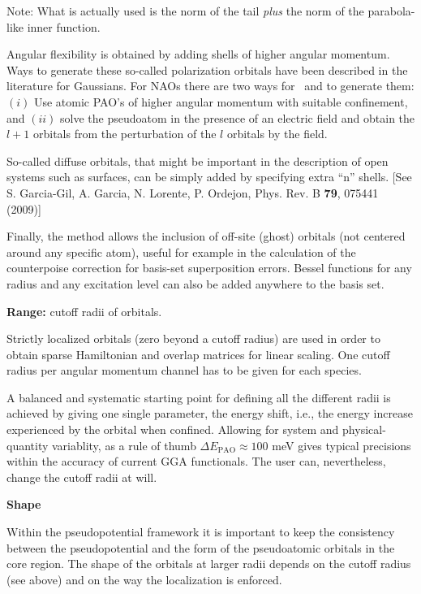 Note: What is actually used is the norm of the tail \emph{plus} the
norm of the parabola-like inner function.

Angular flexibility is obtained by adding shells of higher angular
momentum.  Ways to generate these so-called polarization orbitals have
been described in the literature for Gaussians.  For NAOs there are
two ways for \siesta\ and  to generate them: $(i)$
Use atomic PAO's of higher angular momentum with suitable confinement,
and $(ii)$ solve the pseudoatom in the presence of an electric field
and obtain the $l+1$ orbitals from the perturbation of the $l$
orbitals by the field.

So-called diffuse orbitals, that might be important in the description
of open systems such as surfaces, can be simply added by specifying
extra ``n'' shells. [See S. Garcia-Gil, A. Garcia, N. Lorente,
  P. Ordejon, Phys. Rev. B \textbf{79}, 075441 (2009)]

Finally, the method allows the inclusion of off-site (ghost) orbitals
(not centered around any specific atom), useful for example in the
calculation of the counterpoise correction for basis-set superposition
errors.  Bessel functions for any radius and any excitation level can
also be added anywhere to the basis set.

\textbf{Range:} cutoff radii of orbitals.

Strictly localized orbitals (zero beyond a cutoff radius) are used in
order to obtain sparse Hamiltonian and overlap matrices for linear
scaling. One cutoff radius per angular momentum channel has to be
given for each species.

A balanced and systematic starting point for defining all the
different radii is achieved by giving one single parameter, the energy
shift, i.e., the energy increase experienced by the orbital when confined.
Allowing for system and physical-quantity variablity, as a rule of
thumb $\Delta E_{\mathrm{PAO}} \approx 100$ meV gives typical
precisions within the accuracy of current GGA functionals.  The user
can, nevertheless, change the cutoff radii at will.

\textbf{Shape}

Within the pseudopotential framework it is important to keep the
consistency between the pseudopotential and the form of the
pseudoatomic orbitals in the core region.  The shape of the orbitals
at larger radii depends on the cutoff radius (see above) and on the
way the localization is enforced.


